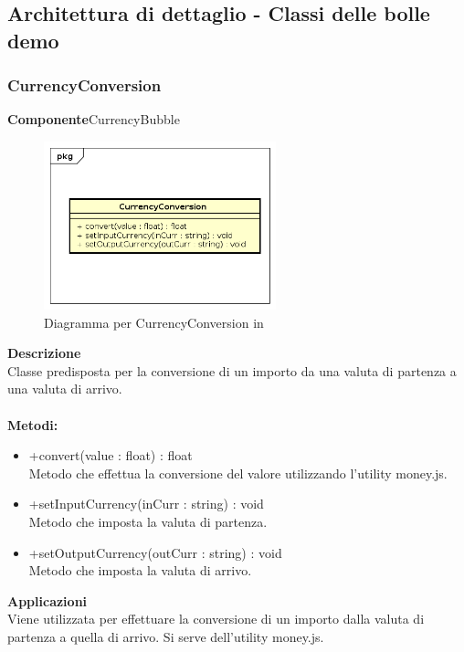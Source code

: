 \subsection{Architettura di dettaglio - Classi delle bolle demo}\subsubsection{CurrencyConversion}
\textbf{Componente}CurrencyBubble\\
   \FloatBarrier
   \begin{figure}[ht]
   \centering
   \includegraphics[width=0.6\textwidth]{img/single-CurrencyConversion}
   \caption{{Diagramma per CurrencyConversion in }}
\end{figure}
\FloatBarrier
\textbf{Descrizione}\\
Classe predisposta per la conversione di un importo da una valuta di partenza a una valuta di arrivo.
\\
\\
\textbf{Metodi:} 
\begin{itemize}
\item +convert(value : float) : float 
\\
Metodo che effettua la conversione del valore utilizzando l'utility money.js.
\item +setInputCurrency(inCurr : string) : void 
\\
Metodo che imposta la valuta di partenza.
\item +setOutputCurrency(outCurr : string) : void 
\\
Metodo che imposta la valuta di arrivo.
\end{itemize} 


\textbf{Applicazioni}\\
Viene utilizzata per effettuare la conversione di un importo dalla valuta di partenza a quella di arrivo. Si serve dell'utility money.js. 


\clearpage

